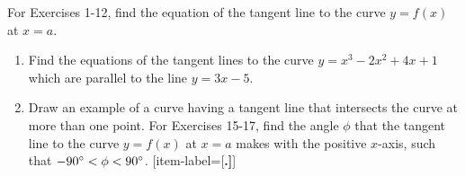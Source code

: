 {\small
{}
\par\noindent For Exercises 1-12, find the equation of the tangent line to the
curve $y = f(x)$ at $x = a$.
\begin{enumerate}[item-label={\bfseries \arabic*.}]
 \item Find the equations of the tangent lines to the curve
  $y = x^3 - 2x^2 + 4x + 1$  which are parallel to the line $y = 3x - 5$.
 \item Draw an example of a curve having a tangent line that intersects the
 curve at more than one point.
\noindent For Exercises 15-17, find the angle $\phi$ that the tangent line to the
curve $y=f(x)$ at $x=a$ makes with the positive $x$-axis, such that
$-90^\circ < \phi < 90^\circ$.
[item-label={{[\bfseries \arabic*.]}}]
\end{enumerate}}
